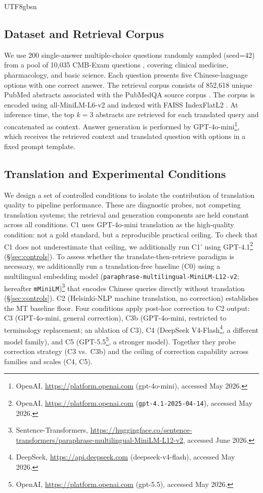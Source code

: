 \documentclass[11pt]{article}
\begin{document}
\begin{CJK}{UTF8}{gbsn}
\subsection{Dataset and Retrieval Corpus}
We use 200 single-answer multiple-choice questions randomly sampled (seed=42) from a pool of 10,035 CMB-Exam questions \cite{wang-etal-2024-cmb}, covering clinical medicine, pharmacology, and basic science. Each question presents five Chinese-language options with one correct answer.  The retrieval corpus consists of 852,618 unique PubMed abstracts associated with the PubMedQA source corpus \cite{jin-etal-2019-pubmedqa}. The corpus is encoded using all-MiniLM-L6-v2 \cite{reimers-gurevych-2019-sentence} and indexed with FAISS IndexFlatL2 \cite{johnson2019billion}. At inference time, the top $k=3$ abstracts are retrieved for each translated query and concatenated as context. Answer generation is performed by GPT-4o-mini\footnote{OpenAI, \url{https://platform.openai.com} (gpt-4o-mini), accessed May 2026.}, which receives the retrieved context and translated question with options in a fixed prompt template.

\subsection{Translation and Experimental Conditions}
We design a set of controlled conditions to isolate the contribution of translation quality to pipeline performance. These are diagnostic probes, not competing translation systems; the retrieval and generation components are held constant across all conditions. C1 uses GPT-4o-mini translation as the high-quality condition: not a gold standard, but a reproducible practical ceiling. To check that C1 does not underestimate that ceiling, we additionally run C1' using GPT-4.1\footnote{OpenAI, \url{https://platform.openai.com} (\texttt{gpt-4.1-2025-04-14}), accessed May 2026.} (\S\ref{sec:controls}). To assess whether the translate-then-retrieve paradigm is necessary, we additionally run a translation-free baseline (C0) using a multilingual embedding model (\texttt{paraphrase-multilingual-MiniLM-L12-v2}; hereafter \texttt{mMiniLM})\footnote{Sentence-Transformers, \url{https://huggingface.co/sentence-transformers/paraphrase-multilingual-MiniLM-L12-v2}, accessed June 2026.} that encodes Chinese queries directly without translation (\S\ref{sec:controls}). C2 (Helsinki-NLP \cite{tiedemann-thottingal-2020-opus} machine translation, no correction) establishes the MT baseline floor. Four conditions apply post-hoc correction to C2 output: C3 (GPT-4o-mini, general correction), C3b (GPT-4o-mini, restricted to terminology replacement; an ablation of C3), C4 (DeepSeek V4-Flash\footnote{DeepSeek, \url{https://api.deepseek.com} (deepseek-v4-flash), accessed May 2026.}, a different model family), and C5 (GPT-5.5\footnote{OpenAI, \url{https://platform.openai.com} (gpt-5.5), accessed May 2026.}, a stronger model). Together they probe correction strategy (C3 vs.\ C3b) and the ceiling of correction capability across families and scales (C4, C5).


\end{CJK}
\end{document}
